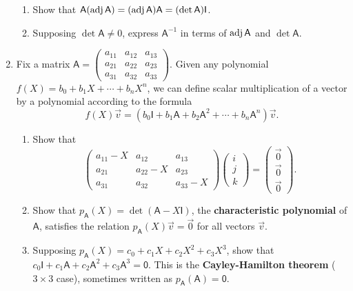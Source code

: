 \begin{enumerate}
\begin{enumerate}
\item Show that $\mathsf{A}(\operatorname{adj}\mathsf{A}) = (\operatorname{adj}\mathsf{A})\mathsf{A} = (\det\mathsf{A})\mathsf{I}$.
\item Supposing $\det\mathsf{A}\neq 0$, express $\mathsf{A}^{-1}$ in terms of $\operatorname{adj}\mathsf{A}$ and $\det\mathsf{A}$.
\end{enumerate}
\item Fix a matrix $\mathsf{A} = \begin{pmatrix} a_{11} & a_{12} & a_{13} \\ a_{21} & a_{22} & a_{23} \\ a_{31} & a_{32} & a_{33} \end{pmatrix}$. Given any polynomial $f(X) = b_0 + b_1X + \cdots + b_nX^n$, we can define scalar multiplication of a vector by a polynomial according to the formula
\begin{equation*}
f(X)\vec{v} = (b_0\mathsf{I} + b_1\mathsf{A} + b_2\mathsf{A}^2 + \cdots + b_n\mathsf{A}^n)\vec{v}.
\end{equation*}
\begin{enumerate}
\item Show that
\begin{equation*}
\begin{pmatrix} a_{11} - X & a_{12} & a_{13} \\ a_{21} & a_{22} - X & a_{23} \\ a_{31} & a_{32} & a_{33} - X \end{pmatrix}\begin{pmatrix} \unit{i} \\ \unit{j} \\ \unit{k} \end{pmatrix} = \begin{pmatrix} \vec{0} \\ \vec{0} \\ \vec{0} \end{pmatrix}.
\end{equation*}
\item Show that $p_{\mathsf{A}}(X) = \det(\mathsf{A} - X\mathsf{I})$, the \textbf{characteristic polynomial} of $\mathsf{A}$, satisfies the relation $p_{\mathsf{A}}(X)\vec{v} = \vec{0}$ for all vectors $\vec{v}$.
\item Supposing $p_{\mathsf{A}}(X) = c_0 + c_1X + c_2X^2 + c_3X^3$, show that $c_0\mathsf{I} + c_1\mathsf{A} + c_2\mathsf{A}^2 + c_3\mathsf{A}^3 = \mathsf{0}$. This is the \textbf{Cayley-Hamilton theorem} ($3\times 3$ case), sometimes written as $p_{\mathsf{A}}(\mathsf{A}) = \mathsf{0}$.
\end{enumerate}
\end{enumerate}


